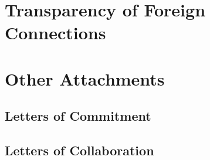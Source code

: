 \documentclass[11pt]{article}
\begin{document}
\newpage
\section{Transparency of Foreign Connections}
\label{app:foreign}



\newpage
\section{Other Attachments}
\subsection{Letters of Commitment}
\label{app:commit}



\subsection{Letters of Collaboration}
\label{app:collab}


\end{document}
